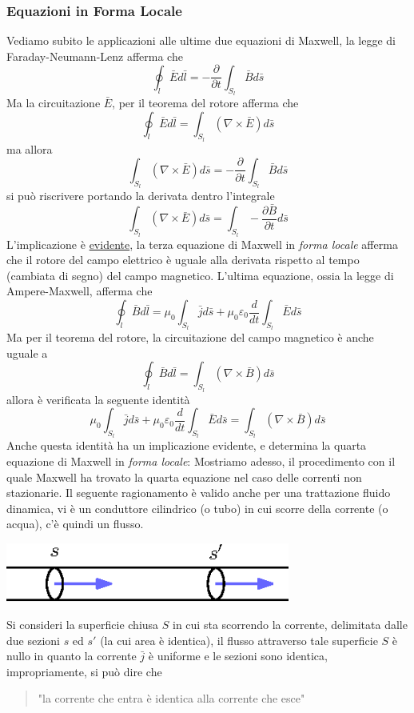 \documentclass[10pt, letterpaper]{report}
\begin{document}
\subsubsection{Equazioni in Forma Locale}
Vediamo subito le applicazioni alle ultime due equazioni di Maxwell, la legge di Faraday-Neumann-Lenz afferma che 
$$ \oint_l \bar E d\bar l = -\frac{\partial}{\partial t}\int_{S_l}\bar B d\bar s$$
Ma la circuitazione $\bar E$, per il teorema del rotore afferma che 
$$ \oint_l \bar E d\bar l = \int_{S_l}(\nabla \times \bar E)d\bar s$$
ma allora 
$$\int_{S_l}(\nabla \times \bar E)d\bar s=-\frac{\partial}{ \partial t}\int_{S_l}\bar B d\bar s$$
si può riscrivere portando la derivata dentro l'integrale 
$$\int_{S_l}(\nabla \times \bar E)d\bar s=\int_{S_l}-\frac{\partial\bar B }{\partial t}d\bar s$$
L'implicazione è \underline{evidente}, la terza equazione di Maxwell in \textit{forma locale} afferma che il rotore del campo elettrico è uguale alla derivata rispetto al tempo (cambiata di segno) del campo magnetico.
L'ultima equazione, ossia la legge di Ampere-Maxwell, afferma che 
$$\oint_l \bar B d\bar l = \mu_0\int_{S_l}\bar j d\bar s+\mu_0\varepsilon_0\frac{d}{dt}\int_{S_l}\bar E d\bar s
$$
Ma per il teorema del rotore, la circuitazione del campo magnetico è anche uguale a
$$\oint_l \bar B d\bar l = \int_{S_l}(\nabla \times \bar B)d\bar s$$
allora è verificata la seguente identità 
$$ \mu_0\int_{S_l}\bar j d\bar s+\mu_0\varepsilon_0\frac{d}{dt}\int_{S_l}\bar E d\bar s=\int_{S_l}(\nabla \times \bar B)d\bar s$$
Anche questa identità ha un implicazione evidente, e determina la quarta equazione di Maxwell in \textit{forma locale}: 
Mostriamo adesso, il procedimento con il quale Maxwell ha trovato la quarta equazione nel caso delle correnti non stazionarie. Il seguente ragionamento è valido anche per una trattazione fluido dinamica, vi è un conduttore cilindrico (o tubo) in cui scorre della corrente (o acqua), c'è quindi un flusso.\begin{center}
    \includegraphics[width=0.7\textwidth]{images/4eqMax.eps}
\end{center}
Si consideri la superficie chiusa $S$ in cui sta scorrendo la corrente, delimitata dalle due sezioni $s$ ed $s'$ (la cui area è identica), il flusso attraverso tale superficie $S$ è nullo in quanto la corrente $\bar j$ è uniforme e le sezioni sono identica, impropriamente, si può dire che \begin{quote}
    "la corrente che entra è identica alla corrente che esce"
\end{quote}
\end{document}

